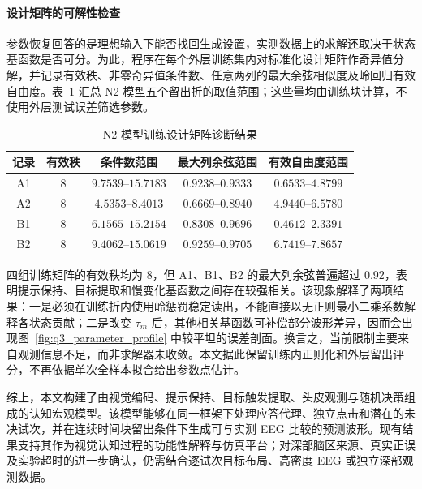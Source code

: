 \documentclass[a4paper,zihao=-4,linespread=1]{ctexart}
\numberwithin{figure}{section}       %
\begin{document}
\paragraph{设计矩阵的可解性检查}

参数恢复回答的是理想输入下能否找回生成设置，实测数据上的求解还取决于状态基函数是否可分。为此，程序在每个外层训练集内对标准化设计矩阵作奇异值分解，并记录有效秩、非零奇异值条件数、任意两列的最大余弦相似度及岭回归有效自由度。表~\ref{tab:q3_design_diagnosis} 汇总 N2 模型五个留出折的取值范围；这些量均由训练块计算，不使用外层测试误差筛选参数。

\begin{table}[H]
\centering
\caption{N2 模型训练设计矩阵诊断结果}
\label{tab:q3_design_diagnosis}
\small
\begin{tabular}{ccccc}
\toprule
\textbf{记录} & \textbf{有效秩} & \textbf{条件数范围} & \textbf{最大列余弦范围} & \textbf{有效自由度范围} \\
\midrule
A1 & 8 & $9.7539$--$15.7183$ & $0.9238$--$0.9333$ & $0.6533$--$4.8799$ \\
A2 & 8 & $4.5353$--$8.4013$  & $0.6669$--$0.8940$ & $4.9440$--$6.5780$ \\
B1 & 8 & $6.1565$--$15.2154$ & $0.8308$--$0.9696$ & $0.4612$--$2.3391$ \\
B2 & 8 & $9.4062$--$15.0619$ & $0.9259$--$0.9705$ & $6.7419$--$7.8657$ \\
\bottomrule
\end{tabular}
\end{table}

四组训练矩阵的有效秩均为 8，但 A1、B1、B2 的最大列余弦普遍超过 0.92，表明提示保持、目标提取和慢变化基函数之间存在较强相关。该现象解释了两项结果：一是必须在训练折内使用岭惩罚稳定读出，不能直接以无正则最小二乘系数解释各状态贡献；二是改变 $\tau_m$ 后，其他相关基函数可补偿部分波形差异，因而会出现图~\ref{fig:q3_parameter_profile} 中较平坦的误差剖面。换言之，当前限制主要来自观测信息不足，而非求解器未收敛。本文据此保留训练内正则化和外层留出评分，不再依据单次全样本拟合给出参数点估计。

综上，本文构建了由视觉编码、提示保持、目标触发提取、头皮观测与随机决策组成的认知宏观模型。该模型能够在同一框架下处理应答代理、独立点击和潜在的未决试次，并在连续时间块留出条件下生成可与实测 EEG 比较的预测波形。现有结果支持其作为视觉认知过程的功能性解释与仿真平台；对深部脑区来源、真实正误及实验超时的进一步确认，仍需结合逐试次目标布局、高密度 EEG 或独立深部观测数据。



\newpage
\end{document}
